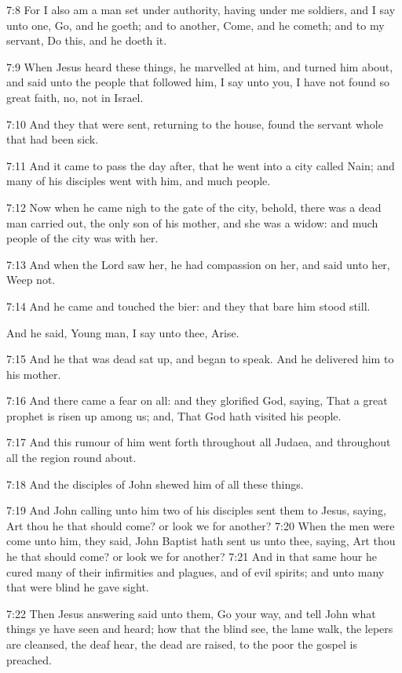 7:8 For I also am a man set under authority, having under me soldiers,
and I say unto one, Go, and he goeth; and to another, Come, and he
cometh; and to my servant, Do this, and he doeth it.

7:9 When Jesus heard these things, he marvelled at him, and turned him
about, and said unto the people that followed him, I say unto you, I
have not found so great faith, no, not in Israel.

7:10 And they that were sent, returning to the house, found the
servant whole that had been sick.

7:11 And it came to pass the day after, that he went into a city
called Nain; and many of his disciples went with him, and much people.

7:12 Now when he came nigh to the gate of the city, behold, there was
a dead man carried out, the only son of his mother, and she was a
widow: and much people of the city was with her.

7:13 And when the Lord saw her, he had compassion on her, and said
unto her, Weep not.

7:14 And he came and touched the bier: and they that bare him stood
still.

And he said, Young man, I say unto thee, Arise.

7:15 And he that was dead sat up, and began to speak. And he delivered
him to his mother.

7:16 And there came a fear on all: and they glorified God, saying,
That a great prophet is risen up among us; and, That God hath visited
his people.

7:17 And this rumour of him went forth throughout all Judaea, and
throughout all the region round about.

7:18 And the disciples of John shewed him of all these things.

7:19 And John calling unto him two of his disciples sent them to
Jesus, saying, Art thou he that should come? or look we for another?
7:20 When the men were come unto him, they said, John Baptist hath
sent us unto thee, saying, Art thou he that should come? or look we
for another?  7:21 And in that same hour he cured many of their
infirmities and plagues, and of evil spirits; and unto many that were
blind he gave sight.

7:22 Then Jesus answering said unto them, Go your way, and tell John
what things ye have seen and heard; how that the blind see, the lame
walk, the lepers are cleansed, the deaf hear, the dead are raised, to
the poor the gospel is preached.


